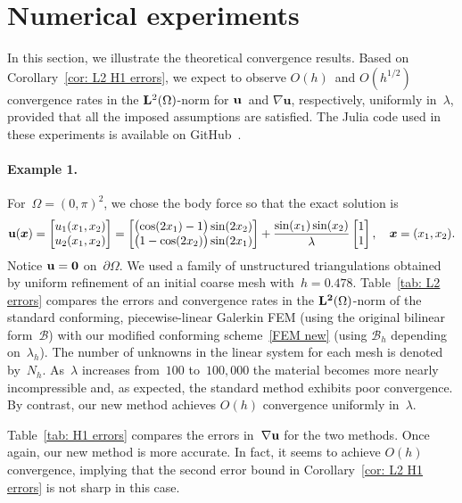 \documentclass[11pt]{article}
\newcommand{\calB}{\mathcal{B}}
\newcommand{\vu}{{\bf u}}
\newcommand{\bsx}{{\boldsymbol{x}}}
\numberwithin{equation}{section}
\begin{document}
\section{Numerical experiments}\label{Sec: Numeric}
In this section, we illustrate the theoretical convergence results. Based on 
Corollary~\ref{cor: L2 H1 errors}, we expect to observe $O(h)$~and $O(h^{1/2})$
convergence rates in the ${\bf L}^2(\Omega)$-norm for ${\bf u}$~and
$\nabla\mathbf{u}$, respectively, uniformly in~$\lambda$, provided that all the
imposed assumptions are  satisfied.   The Julia code used in these experiments
is available on GitHub~\cite{McLean2024}.

\paragraph{Example 1.} For~$\Omega=(0,\pi)^2$, we chose the body force so
that the exact solution is
\[
\vu(\boldsymbol{x})=\begin{bmatrix}  u_1(x_1,x_2)\\  u_2(x_1,x_2)\end{bmatrix}
=\begin{bmatrix}
\bigl(\cos(2x_1)-1\bigr)\sin(2x_2)\\ \bigl(1-\cos(2x_2)\bigr)\sin(2x_1)
\end{bmatrix}
+\frac{\sin(x_1)\sin(x_2)}{\lambda}\begin{bmatrix}1\\ 1\end{bmatrix},
\quad\bsx=(x_1,x_2).
\]
Notice $\vu=\mathbf{0}$ on~$\partial\Omega$.  We used a family of unstructured
triangulations obtained by uniform refinement of an initial coarse mesh
with~$h=0.478$. Table~\ref{tab: L2 errors} compares the errors and convergence
rates in the ${\bf L^2}(\Omega)$-norm of the standard conforming,
piecewise-linear Galerkin FEM (using the original bilinear form~$\calB$) with
our modified conforming scheme~\eqref{FEM new} (using $\calB_h$ depending
on~$\lambda_h$). The number of unknowns in the linear system for each mesh is
denoted by~$N_h$. As~$\lambda$ increases from~$100$ to~$100{,}000$ the material
becomes more nearly incompressible and, as expected, the standard method
exhibits poor convergence. By contrast, our new method achieves $O(h)$
convergence uniformly in~$\lambda$.
   
Table~\ref{tab: H1 errors} compares the errors in~$\nabla {\bf u}$  for the two
methods.  Once again, our new method is more accurate. In fact, it seems to
achieve $O(h)$ convergence, implying that the second error bound in
Corollary~\ref{cor: L2 H1 errors} is not sharp in this case.
\end{document}
